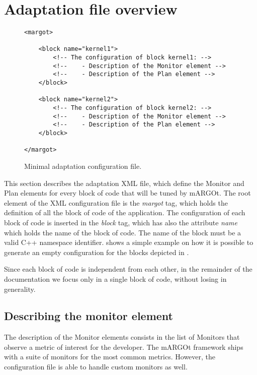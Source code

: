 \section{Adaptation file overview}

\begin{figure}
\lstset{language=XML}
\begin{lstlisting}
<margot>

	<block name="kernel1">
		<!-- The configuration of block kernel1: -->
		<!--    - Description of the Monitor element -->
		<!--    - Description of the Plan element -->
	</block>
	
	<block name="kernel2">
		<!-- The configuration of block kernel2: -->
		<!--    - Description of the Monitor element -->
		<!--    - Description of the Plan element -->
	</block>

</margot>
\end{lstlisting}
\caption{Minimal adaptation configuration file.}
\label{code:min_adaptation}
\end{figure}

This section describes the adaptation XML file, which define the Monitor and Plan elements for every block of code that will be tuned by mARGOt.
The root element of the XML configuration file is the \textit{margot} tag, which holds the definition of all the block of code of the application.
The configuration of each block of code is inserted in the \textit{block} tag, which has also the attribute \textit{name} which holds the name of the block of code.
The name of the block must be a valid C++ namespace identifier.
 shows a simple example on how it is possible to generate an empty configuration for the blocks depicted in .

Since each block of code is independent from each other, in the remainder of the documentation we focus only in a single block of code, without losing in generality.


\subsection{Describing the monitor element}
\label{ssec:monitor_element}

The description of the Monitor elements consists in the list of Monitors that observe a metric of interest for the developer.
The mARGOt framework ships with a suite of monitors for the most common metrics.
However, the configuration file is able to handle custom monitors as well.



